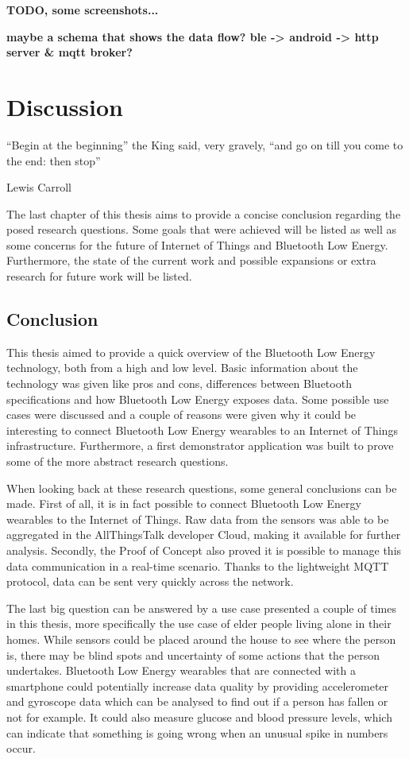 \documentclass[pdftex,a4paper,12pt,twoside]{report}
\begin{document}
\textbf{TODO, some screenshots...}

\textbf{maybe a schema that shows the data flow? ble -> android -> http server \& mqtt broker?}

\chapter{Discussion}
\label{ch:discussion}
\epigraph{``Begin at the beginning'' the King said, very gravely, ``and go on till you come to the end: then stop''}{Lewis Carroll}
The last chapter of this thesis aims to provide a concise conclusion regarding the posed research questions. Some goals that were achieved will be listed as well as some concerns for the future of Internet of Things and Bluetooth Low Energy. Furthermore, the state of the current work and possible expansions or extra research for future work will be listed.

\section{Conclusion}
\label{sec:conclusion}
This thesis aimed to provide a quick overview of the Bluetooth Low Energy technology, both from a high and low level. Basic information about the technology was given like pros and cons, differences between Bluetooth specifications and how Bluetooth Low Energy exposes data. Some possible use cases were discussed and a couple of reasons were given why it could be interesting to connect Bluetooth Low Energy wearables to an Internet of Things infrastructure. Furthermore, a first demonstrator application was built to prove some of the more abstract research questions.

When looking back at these research questions, some general conclusions can be made. First of all, it is in fact possible to connect Bluetooth Low Energy wearables to the Internet of Things. Raw data from the sensors was able to be aggregated in the AllThingsTalk developer Cloud, making it available for further analysis. Secondly, the Proof of Concept also proved it is possible to manage this data communication in a real-time scenario. Thanks to the lightweight MQTT protocol, data can be sent very quickly across the network.

The last big question can be answered by a use case presented a couple of times in this thesis, more specifically the use case of elder people living alone in their homes. While sensors could be placed around the house to see where the person is, there may be blind spots and uncertainty of some actions that the person undertakes. Bluetooth Low Energy wearables that are connected with a smartphone could potentially increase data quality by providing accelerometer and gyroscope data which can be analysed to find out if a person has fallen or not for example. It could also measure glucose and blood pressure levels, which can indicate that something is going wrong when an unusual spike in numbers occur.
\end{document}
